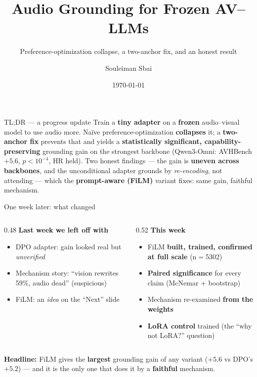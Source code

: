 \documentclass[aspectratio=169,11pt]{beamer}
\title{\textbf{Audio Grounding for Frozen AV--LLMs}}
\subtitle{Preference-optimization collapse, a two-anchor fix, and an honest result}
\author{Souleiman Sbai}
\date{\today}
\begin{document}
{
\begin{frame}
\titlepage
\vspace{-2em}
\begin{block}{TL;DR --- a progress update}
\small Train a \textbf{tiny adapter} on a \textbf{frozen} audio--visual model to use audio more.
Na\"ive preference-optimization \textbf{collapses} it; a \textbf{two-anchor fix} prevents that and yields a
\textbf{statistically significant, capability-preserving} grounding gain on the strongest backbone
(Qwen3-Omni: AVHBench $+5.6$, $p<10^{-4}$, HR held). Two honest findings --- the gain is \textbf{uneven
across backbones}, and the unconditional adapter grounds by \emph{re-encoding}, not attending ---
which the \textbf{prompt-aware (FiLM)} variant fixes: same gain, faithful mechanism.
\end{block}
\end{frame}}

\begin{frame}{One week later: what changed}
\begin{columns}[T]
\begin{column}{0.48\textwidth}
\textbf{Last week we left off with}
\begin{itemize}\small
\item DPO adapter: gain looked real but \emph{unverified}
\item Mechanism story: ``vision rewrites 59\%, audio dead'' (suspicious)
\item FiLM: an \emph{idea} on the ``Next'' slide
\end{itemize}
\end{column}
\begin{column}{0.52\textwidth}
\textbf{This week}
\begin{itemize}\small
\item FiLM \textbf{built, trained, confirmed at full scale} (n$=$5302)
\item \textbf{Paired significance} for every claim (McNemar $+$ bootstrap)
\item Mechanism re-examined \textbf{from the weights}
\item \textbf{LoRA control} trained (the ``why not LoRA?'' question)
\end{itemize}
\end{column}
\end{columns}
\vfill
\begin{center}
\begin{block}{}
\centering\small \textbf{Headline:} FiLM gives the \textbf{largest} grounding gain of any variant
($+5.6$ vs DPO's $+5.2$) --- and it is the only one that does it by a \textbf{faithful} mechanism.
\end{block}
\end{center}
\end{frame}
\end{document}
